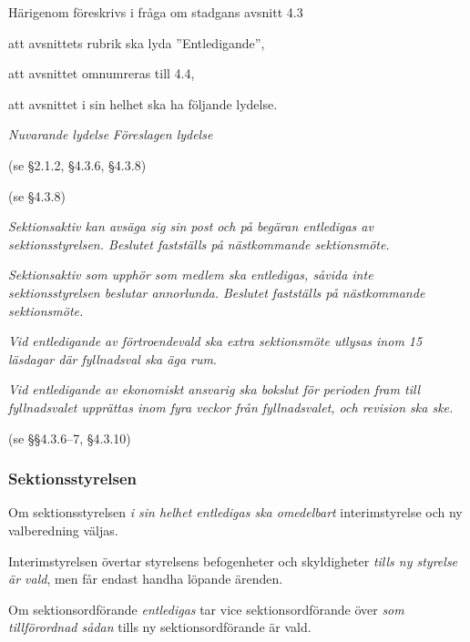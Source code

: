 \documentclass{article}
\newenvironment{lydelse}
    {\begin{paracol}{2}%
        \emph{Nuvarande lydelse}%
        \switchcolumn%
        \emph{Föreslagen lydelse}%
    \end{paracol}%
    \begin{enumerate}[label=\thesubsection.\arabic*]%
    \begin{paracol}{2}%
    }{\end{paracol}\end{enumerate}}
\begin{document}
Härigenom föreskrivs i fråga om stadgans avsnitt 4.3
\begin{dels}
    \item att avsnittets rubrik ska lyda ''Entledigande'',
    \item att avsnittet omnumreras till 4.4,
    \item att avsnittet i sin helhet ska ha följande lydelse.
\end{dels}

\begin{lydelse}
  \item[] (se \S 2.1.2, \S 4.3.6, \S 4.3.8)
  \item[] (se \S 4.3.8)
  
\switchcolumn
  \setcounter{enumi}{0}
  \item \emph{Sektionsaktiv kan avsäga sig sin post och på begäran entledigas av sektionsstyrelsen.
      Beslutet fastställs på nästkommande sektionsmöte.}

  \item \emph{Sektionsaktiv som upphör som medlem ska entledigas, såvida inte sektionsstyrelsen beslutar annorlunda.
      Beslutet fastställs på nästkommande sektionsmöte.}
  \label{4.x:kvarstå}

  \item \emph{Vid entledigande av förtroendevald ska extra sektionsmöte utlysas inom 15 läsdagar där fyllnadsval ska äga rum}.

  \item \emph{Vid entledigande av ekonomiskt ansvarig ska bokslut för perioden fram till fyllnadsvalet upprättas inom fyra veckor från fyllnadsvalet, och revision ska ske.}
    \label{4.2:enteko}

    \switchcolumn*
    \item[] (se \S\S 4.3.6--7, \S 4.3.10)
    \switchcolumn
    \subsubsection*{Sektionsstyrelsen}
    \item Om sektionsstyrelsen \emph{i sin helhet entledigas ska omedelbart} interimstyrelse och ny valberedning väljas.

    \item Interimstyrelsen övertar styrelsens befogenheter och skyldigheter \emph{tills ny styrelse är vald}, men får endast handha löpande ärenden.

    \item Om sektionsordförande \emph{entledigas} tar vice sektionsordförande över \emph{som tillförordnad sådan} tills ny sektionsordförande är vald.


\end{lydelse}
\end{document}
